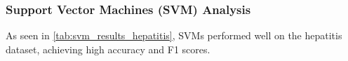 \subsubsection{Support Vector Machines (SVM) Analysis}
\label{subsubsec:discussion-svm}

As seen in \autoref{tab:svm_results_hepatitis}, SVMs performed well on the hepatitis dataset, achieving high accuracy and F1 scores.

